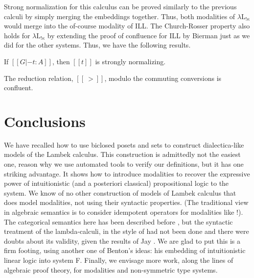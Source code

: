 \documentclass{llncs}
\begin{document}
Strong normalization for this calculus can be proved similarly to the
previous calculi by simply merging the embeddings together.  Thus,
both modalities of $\lambda\text{L}_{!\kappa}$ would merge into the
of-course modality of ILL.  The Church-Rosser property also holds for
$\lambda\text{L}_{!\kappa}$ by extending the proof of confluence for
ILL by Bierman \cite{Bierman:1994} just as we did for the other
systems.  Thus, we have the following results.

\begin{theorem}
  \label{theorem:strong_normalization_lambdaL!k}
  If $[[G |- t : A]]$, then $[[t]]$ is strongly normalizing.
\end{theorem}

\begin{theorem}[Confluence]
  \label{thm:confluence-lambdaL!k}
  The reduction relation, $[[~>]]$, modulo the commuting conversions
  is confluent.
\end{theorem}


\section{Conclusions}
We have recalled how to use biclosed posets and sets to construct dialectica-like models of the Lambek calculus. This construction is admittedly not the easiest one, reason why we use automated tools to verify our definitions, but it has one striking advantage. It shows how to introduce modalities to recover the expressive power of intuitionistic (and a posteriori classical) propositional logic to the system. We know of no other construction of models of Lambek calculus  that does  model  modalities, not using their syntactic properties. (The traditional view in algebraic semantics is to consider idempotent operators for modalities like !). The categorical semantics  here has been described before \cite{depaiva1991}, but the syntactic treatment of the lambda-calculi, in the style of \cite{benton1993} had not been done and there were doubts about its validity, given the results of Jay \cite{jay1991}. We are glad to put this is a firm footing, using another one of Benton's ideas: his embedding of intuitionistic linear logic into system F. Finally, we envisage more work, along the lines of algebraic proof theory, for modalities and non-symmetric type systems.



\end{document}
